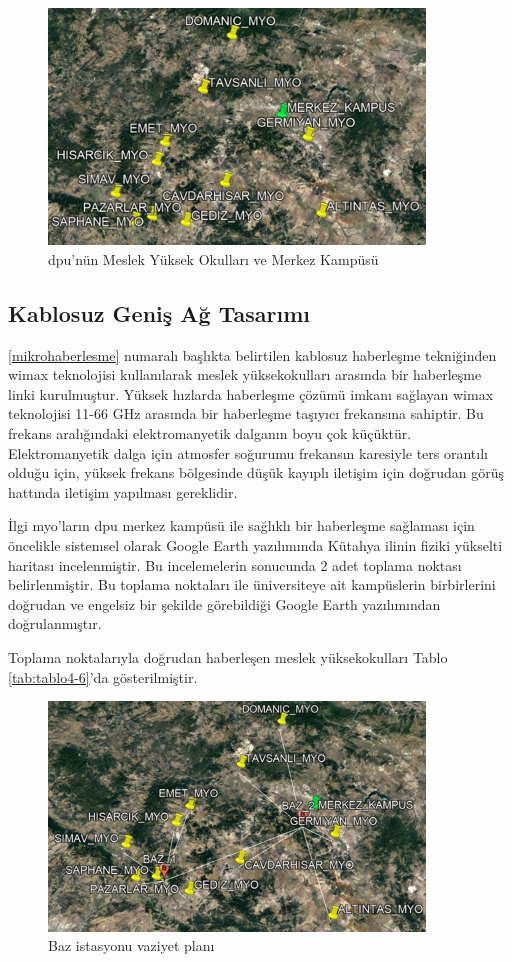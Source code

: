 \begin{figure}[htbp]
\centerline{\includegraphics[width=10cm]{Resim/sekil4-26.jpg}}
\caption{\gls{dpu}’nün Meslek Yüksek Okulları ve Merkez Kampüsü}
\label{fig:4-27}
\end{figure}


\subsection{Kablosuz Geniş Ağ Tasarımı}

\ref{mikrohaberlesme} numaralı başlıkta belirtilen kablosuz haberleşme tekniğinden \gls{wimax} teknolojisi kullanılarak meslek yüksekokulları arasında bir haberleşme linki kurulmuştur. Yüksek hızlarda haberleşme çözümü imkanı sağlayan \gls{wimax} teknolojisi 11-66 GHz arasında bir haberleşme taşıyıcı frekansına sahiptir. Bu frekans aralığındaki elektromanyetik dalganın boyu çok küçüktür. Elektromanyetik dalga için atmosfer soğurumu frekansın karesiyle ters orantılı olduğu için, yüksek frekans bölgesinde düşük kayıplı iletişim için doğrudan görüş hattında iletişim yapılması gereklidir.

İlgi \gls{myo}'ların \gls{dpu} merkez kampüsü ile sağlıklı bir haberleşme sağlaması için öncelikle sistemsel olarak Google Earth yazılımında Kütahya ilinin fiziki yükselti haritası incelenmiştir. Bu incelemelerin sonucunda 2 adet toplama noktası belirlenmiştir. Bu toplama noktaları ile üniversiteye ait kampüslerin birbirlerini doğrudan ve engelsiz bir şekilde görebildiği Google Earth yazılımından doğrulanmıştır.

Toplama noktalarıyla doğrudan haberleşen meslek yüksekokulları Tablo \ref{tab:tablo4-6}'da gösterilmiştir.



\begin{figure}[htbp]
\centerline{\includegraphics[width=10cm]{Resim/sekil4-27.jpg}}
\caption{Baz istasyonu vaziyet planı}
\label{fig:4-28}
\end{figure}




